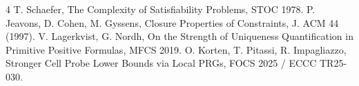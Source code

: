 \documentclass[11pt]{article}
\begin{document}
\begin{thebibliography}{4}
 T. Schaefer, The Complexity of Satisfiability Problems, STOC 1978.
 P. Jeavons, D. Cohen, M. Gyssens, Closure Properties of Constraints, J. ACM 44 (1997).
 V. Lagerkvist, G. Nordh, On the Strength of Uniqueness Quantification in Primitive Positive Formulas, MFCS 2019.
 O. Korten, T. Pitassi, R. Impagliazzo, Stronger Cell Probe Lower Bounds via Local PRGs, FOCS 2025 / ECCC TR25-030.
\end{thebibliography}
\end{document}
